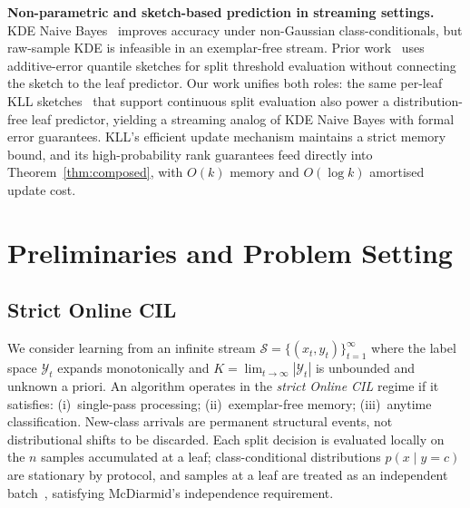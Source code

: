 \documentclass{article}
\begin{document}
\noindent
\textbf{Non-parametric and sketch-based prediction in streaming settings.}
KDE Naive Bayes~\cite{john1995,Moghaddam2002} improves accuracy under non-Gaussian
class-conditionals, but raw-sample KDE is infeasible in an exemplar-free
stream. Prior work~\cite{benhaim2010} uses additive-error quantile sketches for split threshold
evaluation without connecting the sketch to the leaf
predictor. Our work unifies both roles: the same per-leaf KLL sketches~\cite{Karnin2016} that
support continuous split evaluation also power a distribution-free leaf
predictor, yielding a streaming analog of KDE Naive Bayes with formal error
guarantees. KLL’s efficient update mechanism maintains a strict memory bound, and its high-probability rank guarantees feed directly into Theorem~\ref{thm:composed}, with $O(k)$ memory and
$O(\log k)$ amortised update cost.
\section{Preliminaries and Problem Setting}
\label{sec:prelim}
\subsection{Strict Online CIL}
We consider learning from an infinite stream $\mathcal{S} = \{(x_t, y_t)\}_{t=1}^\infty$
where the label space $\mathcal{Y}_t$ expands monotonically and
$K = \lim_{t\to\infty}|\mathcal{Y}_t|$ is unbounded and unknown a priori.
An algorithm operates in the \emph{strict Online CIL} regime if it satisfies:
(i)~single-pass processing; (ii)~exemplar-free memory; (iii)~anytime classification.
New-class arrivals are permanent structural events, not distributional shifts
to be discarded. Each split decision is evaluated locally on the $n$ samples
accumulated at a leaf; class-conditional distributions $p(x \mid y=c)$ are
stationary by protocol, and samples at a leaf are treated as an independent
batch~\cite{DomingosHulten2000}, satisfying McDiarmid's independence requirement.
\enlargethispage{2\baselineskip}
\end{document}
